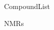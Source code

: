 \documentclass[10pt,a4paper]{article}
\begin{document}
	

{CompoundList}

\tableofcontents




{NMRs}

%
\end{document}
